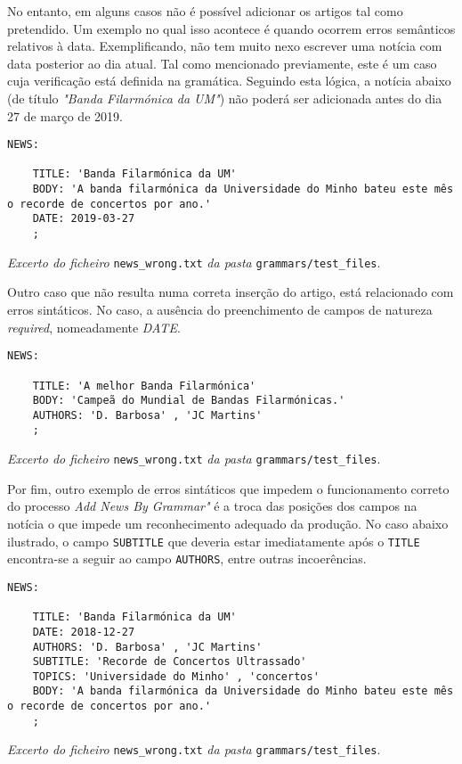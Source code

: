 No entanto, em alguns casos não é possível adicionar os artigos tal como pretendido. Um exemplo no qual isso acontece é quando ocorrem erros semânticos relativos à data. Exemplificando, não tem muito nexo escrever uma notícia com data posterior ao dia atual. Tal como mencionado previamente, este é um caso cuja verificação está definida na gramática. Seguindo esta lógica, a notícia abaixo (de título \textit{"Banda Filarmónica da UM"}) não poderá ser adicionada antes do dia 27 de março de 2019.
\begin{framed}
\begin{lstlisting}[language=ANTLR]
    NEWS:
    
    TITLE: 'Banda Filarmónica da UM'
    BODY: 'A banda filarmónica da Universidade do Minho bateu este mês o recorde de concertos por ano.'
    DATE: 2019-03-27
    ;
\end{lstlisting}
\end{framed}
\begin{center}
\textit{Excerto do ficheiro} \texttt{news\_wrong.txt} \textit{da pasta} \texttt{grammars/test\_files}.
\end{center}

Outro caso que não resulta numa correta inserção do artigo, está relacionado com erros sintáticos. No caso, a ausência do preenchimento de campos de natureza \textit{required}, nomeadamente \textit{DATE}.
\begin{framed}
\begin{lstlisting}[language=ANTLR]
    NEWS:
    
    TITLE: 'A melhor Banda Filarmónica'
    BODY: 'Campeã do Mundial de Bandas Filarmónicas.'
    AUTHORS: 'D. Barbosa' , 'JC Martins'
    ;
\end{lstlisting}
\end{framed}
\begin{center}
\textit{Excerto do ficheiro} \texttt{news\_wrong.txt} \textit{da pasta} \texttt{grammars/test\_files}.
\end{center}

Por fim, outro exemplo de erros sintáticos que impedem o funcionamento correto do processo \textit{Add News By Grammar"} é a troca das posições dos campos na notícia o que impede um reconhecimento adequado da produção. No caso abaixo ilustrado, o campo \texttt{SUBTITLE} que deveria estar imediatamente após o \texttt{TITLE} encontra-se a seguir ao campo \texttt{AUTHORS}, entre outras incoerências.
\begin{framed}
\begin{lstlisting}[language=ANTLR]
    NEWS:
    
    TITLE: 'Banda Filarmónica da UM'
    DATE: 2018-12-27
    AUTHORS: 'D. Barbosa' , 'JC Martins'
    SUBTITLE: 'Recorde de Concertos Ultrassado'
    TOPICS: 'Universidade do Minho' , 'concertos'
    BODY: 'A banda filarmónica da Universidade do Minho bateu este mês o recorde de concertos por ano.'
    ;
\end{lstlisting}
\end{framed}
\begin{center}
\textit{Excerto do ficheiro} \texttt{news\_wrong.txt} \textit{da pasta} \texttt{grammars/test\_files}.
\end{center}


